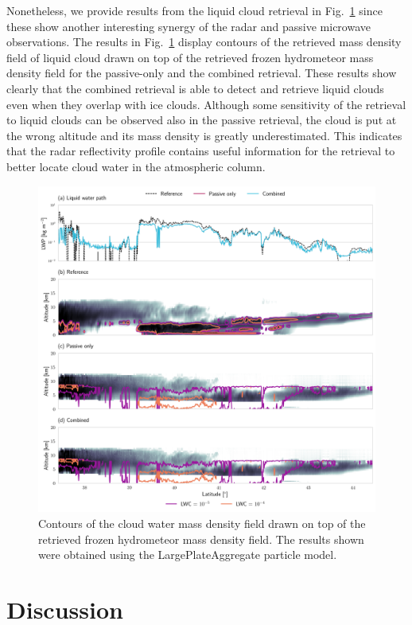 \documentclass[journal abbreviation, manuscript]{copernicus}
\begin{document}
Nonetheless, we provide results from the liquid cloud retrieval in
Fig.~\ref{fig:results_cw_b} since these show another interesting synergy of the
radar and passive microwave observations. The results in
Fig.~\ref{fig:results_cw_b} display contours of the retrieved mass density field
of liquid cloud drawn on top of the retrieved frozen hydrometeor mass density
field for the passive-only and the combined retrieval. These results show
clearly that the combined retrieval is able to detect and retrieve liquid clouds
even when they overlap with ice clouds. Although some sensitivity of the
retrieval to liquid clouds can be observed also in the passive retrieval, the
cloud is put at the wrong altitude and its mass density is greatly
underestimated. This indicates that the radar reflectivity profile contains
useful information for the retrieval to better locate cloud water in the
atmospheric column.

\begin{figure}
\centering
\includegraphics[width = \textwidth]{../plots/results_cw_b_LargePlateAggregate}
\caption{Contours of the cloud water mass density field drawn on top of the retrieved
  frozen hydrometeor mass density field. The results shown were obtained using the
  LargePlateAggregate particle model.}
\label{fig:results_cw_b}
\end{figure}


\section{Discussion}
\label{sec:discussion}
\end{document}
